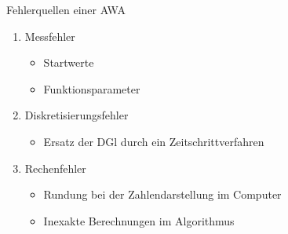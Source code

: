 \begin{frame}{Fehlerquellen einer AWA}
  \begin{enumerate}
  \item Messfehler
    \begin{itemize}
    \item Startwerte
    \item Funktionsparameter
    \end{itemize}
  \item Diskretisierungsfehler
    \begin{itemize}
    \item Ersatz der DGl durch ein Zeitschrittverfahren
    \end{itemize}
  \item Rechenfehler
    \begin{itemize}
    \item Rundung bei der Zahlendarstellung im Computer
    \item Inexakte Berechnungen im Algorithmus
    \end{itemize}
  \end{enumerate}
\end{frame}


